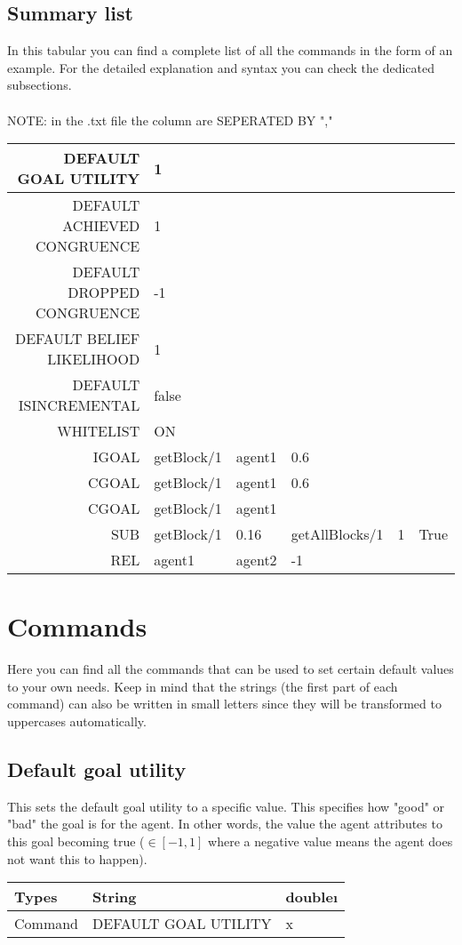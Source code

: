 \documentclass{scrartcl}
\begin{document}
\subsection{Summary list}
In this tabular you can find a complete list of all the commands in the form of an example. For the detailed explanation and syntax you can check the dedicated subsections.\\
\\
NOTE: in the .txt file the column are SEPERATED BY ","\\
\begin{tabular}{|r|l|l|l|l|l|}
	\hline  DEFAULT GOAL UTILITY & 1 &  &  &  &\\ 
	\hline  DEFAULT ACHIEVED CONGRUENCE & 1 &  &  &  &\\ 
	\hline  DEFAULT DROPPED CONGRUENCE & -1 &  &  &  &\\ 
	\hline  DEFAULT BELIEF LIKELIHOOD& 1 &  &  &  &\\ 
	\hline  DEFAULT ISINCREMENTAL & false &  &  &  &\\ 
	\hline  WHITELIST & ON &  &  &  &\\ 
	\hline  IGOAL &  getBlock/1 &  agent1 &  0.6&  &\\ 
	\hline  CGOAL &  getBlock/1 &  agent1 &  0.6&  &\\ 
	\hline  CGOAL &  getBlock/1 &  agent1 &  &  &\\
	\hline  SUB& getBlock/1 & 0.16 & getAllBlocks/1 & 1 & True\\ 
	\hline  REL &  agent1&  agent2 & -1 &  &\\
	\hline  
\end{tabular}

\pagebreak
\section{Commands}
Here you can find all the commands that can be used to set certain default values to your own needs. Keep in mind that the strings (the first part of each command) can also be written in small letters since they will be transformed to uppercases automatically. 

\subsection{Default goal utility}

This sets the default goal utility to a specific value. This specifies how "good" or "bad" the goal is for the agent. In other words, the value the agent attributes to this goal
becoming true ($  \in[-1, 1]$ where a negative value means the agent does not want this to happen).\\
\begin{tabular}{|l|l|l|}
	\hline  Types & String & double\i  \\ 
	\hline  Command & DEFAULT GOAL UTILITY & x  \\ 
	\hline 
\end{tabular}
\\
\end{document}
